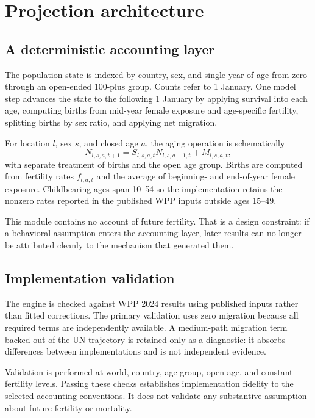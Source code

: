 \section{Projection architecture}

\subsection{A deterministic accounting layer}

The population state is indexed by country, sex, and single year of age from
zero through an open-ended 100-plus group. Counts refer to 1 January. One model
step advances the state to the following 1 January by applying survival into
each age, computing births from mid-year female exposure and age-specific
fertility, splitting births by sex ratio, and applying net migration.

For location $l$, sex $s$, and closed age $a$, the aging operation is
schematically
\begin{equation}
  N_{l,s,a,t+1} = S_{l,s,a,t} N_{l,s,a-1,t} + M_{l,s,a,t},
\end{equation}
with separate treatment of births and the open age group. Births are computed
from fertility rates $f_{l,a,t}$ and the average of beginning- and end-of-year
female exposure. Childbearing ages span 10--54 so the implementation retains
the nonzero rates reported in the published WPP inputs outside ages 15--49.

This module contains no account of future fertility. That is a design
constraint: if a behavioral assumption enters the accounting layer, later
results can no longer be attributed cleanly to the mechanism that generated
them.

\subsection{Implementation validation}

The engine is checked against WPP 2024 results using published inputs rather
than fitted corrections. The primary validation uses zero migration because
all required terms are independently available. A medium-path migration term
backed out of the UN trajectory is retained only as a diagnostic: it absorbs
differences between implementations and is not independent evidence.

Validation is performed at world, country, age-group, open-age, and
constant-fertility levels. Passing these checks establishes implementation
fidelity to the selected accounting conventions. It does not validate any
substantive assumption about future fertility or mortality.

